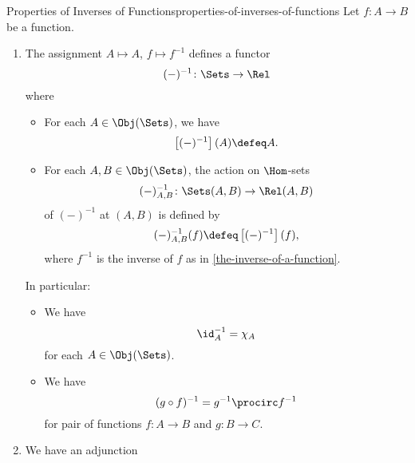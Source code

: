 \begin{proposition}{Properties of Inverses of Functions}{properties-of-inverses-of-functions}%
    Let $f\colon A\to B$ be a function.
    \begin{enumerate}
        \item\label{properties-of-inverses-of-functions-functoriality}The assignment $A\mapsto A$, $f\mapsto f^{-1}$ defines a functor
            \[
                (-)^{-1}%
                \colon%
                \Sets%
                \to%
                \Rel%
            \]%
            where
            \begin{itemize}
                \item{}For each $A\in\Obj(\Sets)$, we have
                    \[
                        \left[(-)^{-1}\right](A)%
                        \defeq
                        A.
                    \]%
                \item{}For each $A,B\in\Obj(\Sets)$, the action on $\Hom$-sets
                    \[
                        (-)^{-1}_{A,B}%
                        \colon%
                        \Sets(A,B)
                        \to
                        \Rel(A,B)
                    \]%
                    of $(-)^{-1}$ at $(A,B)$ is defined by
                    \[
                        (-)^{-1}_{A,B}(f)
                        \defeq
                        \left[(-)^{-1}\right](f),
                    \]%
                    where $f^{-1}$ is the inverse of $f$ as in \cref{the-inverse-of-a-function}.
            \end{itemize}
            In particular:
            \begin{itemize}
                \item{}We have
                    \[
                        \id^{-1}_{A}%
                        =%
                        \chi_{A}%
                    \]%
                    for each $A\in\Obj(\Sets)$.
                \item{}We have
                    \[
                        (g\circ f)^{-1}%
                        =%
                        g^{-1}\procirc f^{-1}
                    \]%
                    for pair of functions $f\colon A\to B$ and $g\colon B\to C$.
            \end{itemize}
        \item\label{properties-of-inverses-of-functions-adjointness-inside-sfbfrel}We have an adjunction

\end{enumerate}
\end{proposition}

